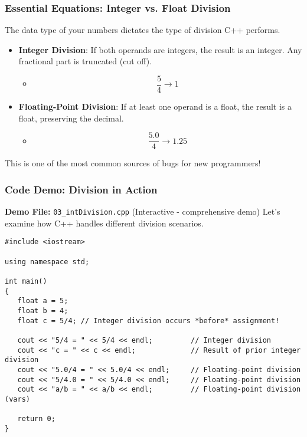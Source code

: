 \documentclass{beamer}
\begin{document}
\begin{frame}
\frametitle{Essential Equations: Integer vs. Float Division}
The data type of your numbers dictates the type of division C++ performs.

\begin{itemize}
    \item \textbf{Integer Division}: If both operands are integers, the result is an integer. Any fractional part is \alert{truncated} (cut off).
    \begin{itemize}
        \item \[ \frac{5}{4} \rightarrow 1 \]
    \end{itemize}
    \pause
    \item \textbf{Floating-Point Division}: If at least one operand is a float, the result is a float, preserving the decimal.
    \begin{itemize}
        \item \[ \frac{5.0}{4} \rightarrow 1.25 \]
    \end{itemize}
\end{itemize}
\pause
\vspace{1em}
This is one of the most common sources of bugs for new programmers!
\end{frame}

\begin{frame}[fragile]
\frametitle{Code Demo: Division in Action}
\textbf{Demo File:} \texttt{03\_intDivision.cpp} (Interactive - comprehensive demo)
\newline
\vspace{1em}
Let's examine how C++ handles different division scenarios.

\begin{verbatim}
#include <iostream>

using namespace std;

int main()
{
   float a = 5;
   float b = 4;
   float c = 5/4; // Integer division occurs *before* assignment!

   cout << "5/4 = " << 5/4 << endl;         // Integer division
   cout << "c = " << c << endl;             // Result of prior integer division
   cout << "5.0/4 = " << 5.0/4 << endl;     // Floating-point division
   cout << "5/4.0 = " << 5/4.0 << endl;     // Floating-point division
   cout << "a/b = " << a/b << endl;         // Floating-point division (vars)

   return 0;
}
\end{verbatim}
\end{frame}
\end{document}
